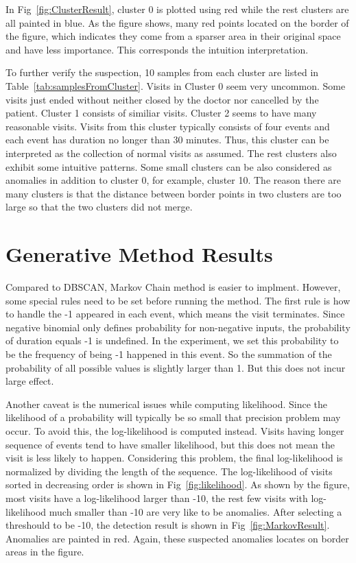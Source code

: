 In Fig~\ref{fig:ClusterResult}, cluster 0 is plotted using red while the rest clusters are all painted in blue. As the figure shows, many red points located on the border of the figure, which indicates they come from a sparser area in their original space and have less importance. This corresponds the intuition interpretation.

To further verify the suspection, 10 samples from each cluster are listed in Table~\ref{tab:samplesFromCluster}. Visits in Cluster 0 seem very uncommon. Some visits just ended without neither closed by the doctor nor cancelled by the patient. Cluster 1 consists of similiar visits. Cluster 2 seems to have many reasonable visits. Visits from this cluster typically consists of four events and each event has duration no longer than 30 minutes. Thus, this cluster can be interpreted as the collection of normal visits as assumed. The rest clusters also exhibit some intuitive patterns. Some small clusters can be also considered as anomalies in addition to cluster 0, for example, cluster 10. The reason there are many clusters is that the distance between border points in two clusters are too large so that the two clusters did not merge. 

\section{Generative Method Results}
\label{sec:generative}
Compared to DBSCAN, Markov Chain method is easier to implment. However, some special rules need to be set before running the method. The first rule is how to handle the -1 appeared in each event, which means the visit terminates. Since negative binomial only defines probability for non-negative inputs, the probability of duration equals -1 is undefined. In the experiment, we set this probability to be the frequency of being -1 happened in this event. So the summation of the probability of all possible values is slightly larger than 1. But this does not incur large effect.

Another caveat is the numerical issues while computing likelihood. Since the likelihood of a probability will typically be so small that precision problem may occur. To avoid this, the log-likelihood is computed instead. Visits having longer sequence of events tend to have smaller likelihood, but this does not mean the visit is less likely to happen. Considering this problem, the final log-likelihood is normalized by dividing the length of the sequence. The log-likelihood of visits sorted in decreasing order is shown in Fig~\ref{fig:likelihood}. As shown by the figure, most visits have a log-likelihood larger than -10, the rest few visits with log-likelihood much smaller than -10 are very like to be anomalies. After selecting a threshould to be -10, the detection result is shown in Fig~\ref{fig:MarkovResult}. Anomalies are painted in red. Again, these suspected anomalies locates on border areas in the figure.

